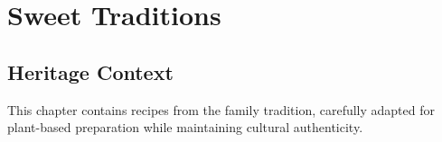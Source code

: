 \chapter{Sweet Traditions}

\section*{Heritage Context}

This chapter contains recipes from the family tradition, carefully adapted for plant-based preparation while maintaining cultural authenticity.

% 

